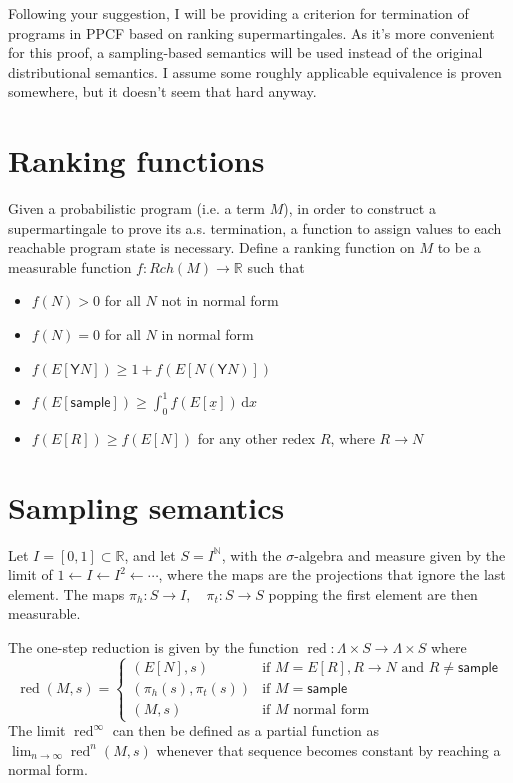 \documentclass{article}
\newcommand{\Y}{\textsf{Y}}
\newcommand{\sample}{\textsf{sample}}
\DeclareMathOperator{\red}{red}
\begin{document}
Following your suggestion, I will be providing a criterion for termination of programs in PPCF\cite{ppcf} based on ranking supermartingales. As it's more convenient for this proof, a sampling-based semantics will be used instead of the original distributional semantics. I assume some roughly applicable equivalence is proven somewhere, but it doesn't seem that hard anyway.

\section{Ranking functions}
Given a probabilistic program (i.e. a term $M$), in order to construct a supermartingale to prove its a.s. termination, a function to assign values to each reachable program state is necessary. Define a ranking function on $M$ to be a measurable function $f:Rch(M) \to \mathbb{R}$ such that
\begin{itemize}
    \item $f(N) > 0$ for all $N$ not in normal form
    \item $f(N) = 0$ for all $N$ in normal form
    \item $f(E[\Y N]) \geq 1 + f(E[N(\Y N)])$
    \item $f(E[\sample]) \geq \int_0^1 f(E[\underline{x}]) \, \mathrm{d}x$
    \item $f(E[R]) \geq f(E[N])$ for any other redex $R$, where $R \to N$
\end{itemize}

\section{Sampling semantics}
Let $ I = [0,1] \subset \mathbb{R} $, and let $S = I^{\mathbb{N}}$, with the $\sigma$-algebra and measure given by the limit of $1 \gets I \gets I^2 \gets \cdots$, where the maps are the projections that ignore the last element. The maps $\pi_h:S \to I, \quad \pi_t:S \to S$ popping the first element are then measurable.

The one-step reduction is given by the function $\red : \Lambda \times S \to \Lambda \times S$ where
\begin{equation}
\red(M,s) = \left\{
    \begin{array}{ll}
        (E[N],s) & \text{if } M = E[R], R \to N \text{ and } R \neq \sample \\
        (\pi_h(s),\pi_t(s)) & \text{if } M =  \sample \\
        (M,s) & \text{if } M \text{ normal form}
    \end{array} \right .
\end{equation}
The limit $\red^\infty$ can then be defined as a partial function as $\lim_{n \to \infty} \red^n(M,s)$ whenever that sequence becomes constant by reaching a normal form.
\end{document}
